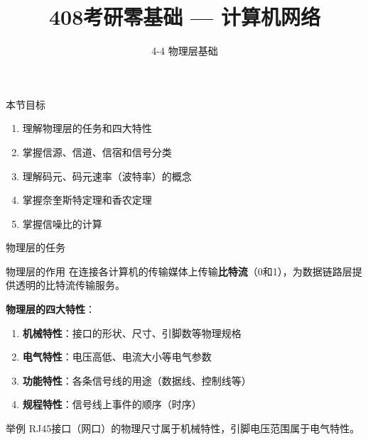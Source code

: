 \documentclass[10pt, aspectratio=169]{beamer}
\title{408考研零基础 --- 计算机网络}
\subtitle{4-4 物理层基础}
\author{}
\date{}
\begin{document}
\begin{frame}{本节目标}
    \begin{enumerate}
        \item 理解物理层的任务和四大特性
        \item 掌握信源、信道、信宿和信号分类
        \item 理解码元、码元速率（波特率）的概念
        \item 掌握奈奎斯特定理和香农定理
        \item 掌握信噪比的计算
    \end{enumerate}
\end{frame}

\begin{frame}{物理层的任务}
    \begin{block}{物理层的作用}
        在连接各计算机的传输媒体上传输\textbf{比特流}（0和1），为数据链路层提供透明的比特流传输服务。
    \end{block}
    \vspace{0.5em}
    \textbf{物理层的四大特性}：
    \begin{enumerate}
        \item \textbf{机械特性}：接口的形状、尺寸、引脚数等物理规格
        \item \textbf{电气特性}：电压高低、电流大小等电气参数
        \item \textbf{功能特性}：各条信号线的用途（数据线、控制线等）
        \item \textbf{规程特性}：信号线上事件的顺序（时序）
    \end{enumerate}
    \vspace{0.3em}
    \begin{exampleblock}{举例}
        RJ45接口（网口）的物理尺寸属于机械特性，引脚电压范围属于电气特性。
    \end{exampleblock}
\end{frame}
\end{document}
